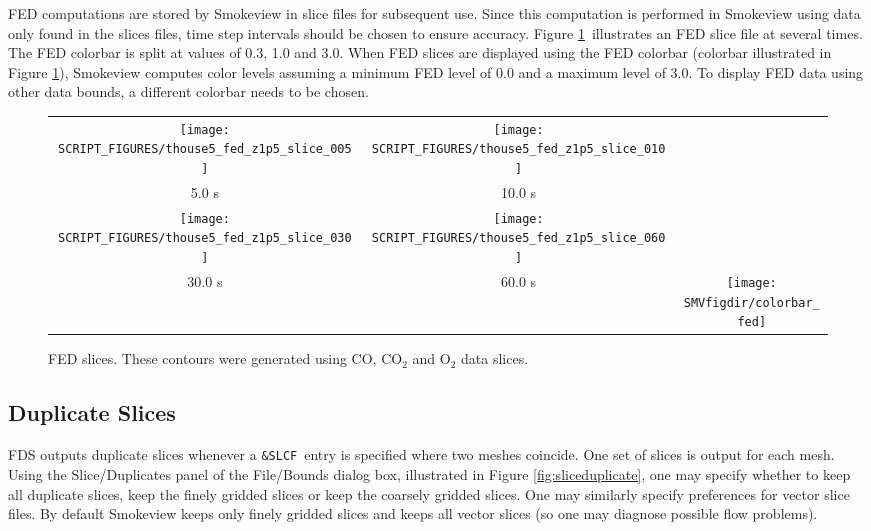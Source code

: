 \documentclass[11pt,twoside]{book}
\newcommand{\figheightAbar}{2.2in}
\begin{document}
FED computations are stored by Smokeview in slice files for subsequent use.
Since this computation
is performed in Smokeview using data only found in the slices files, time step intervals
should be chosen to ensure accuracy.  Figure \ref{figfedslice}\ illustrates
an FED slice file at several times.  The FED colorbar is split at values of 0.3, 1.0 and 3.0.  When FED slices are displayed using the FED colorbar (colorbar illustrated in Figure \ref{figfedslice}), Smokeview computes color levels assuming a minimum FED level of 0.0 and a maximum level of 3.0.  To display FED data using other data bounds, a different colorbar needs to be chosen.

\begin{figure}[bph]
\begin{center}
\begin{tabular}{ccc}
\texttt{[image: SCRIPT\_FIGURES/thouse5\_fed\_z1p5\_slice\_005]}&
\texttt{[image: SCRIPT\_FIGURES/thouse5\_fed\_z1p5\_slice\_010]}\\
5.0 s&10.0 s\\
\texttt{[image: SCRIPT\_FIGURES/thouse5\_fed\_z1p5\_slice\_030]}&
\texttt{[image: SCRIPT\_FIGURES/thouse5\_fed\_z1p5\_slice\_060]}&\\
30.0 s&60.0 s
&\raisebox{0.0ex}[0pt]{\texttt{[image: \\SMVfigdir/colorbar\_fed]}}\\
\end{tabular}
\caption [FED slices.]
{FED slices.
These contours were generated using CO, $\mathrm{CO_2}$ and $\mathrm{O_2}$ data slices.
}
\label{figfedslice}%
\end{center}
\end{figure}

\subsection{Duplicate Slices}
FDS outputs duplicate slices whenever a {\tt \&SLCF}\ entry is specified where two meshes coincide.
One set of slices is output for each mesh.
Using the Slice/Duplicates panel of the File/Bounds dialog box, illustrated in Figure \ref{fig:sliceduplicate},
one may specify whether to keep all duplicate slices, keep the finely gridded slices or keep the coarsely gridded slices.
One may similarly specify preferences for vector slice files. By default Smokeview keeps only finely
gridded slices and keeps all vector slices (so one may diagnose possible flow problems).
\end{document}
